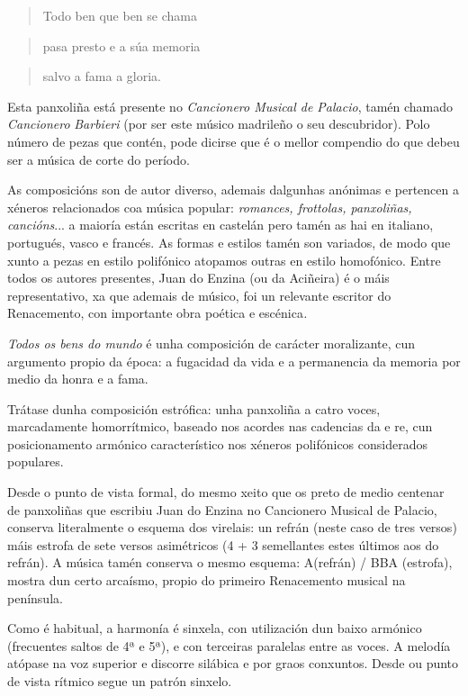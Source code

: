 \documentclass[
]{article}
\begin{document}
\begin{quote}
Todo ben que ben se chama
\end{quote}

\begin{quote}
pasa presto e a súa memoria
\end{quote}

\begin{quote}
salvo a fama a gloria.
\end{quote}

Esta panxoliña está presente no \emph{Cancionero Musical de Palacio},
tamén chamado \emph{Cancionero} \emph{Barbieri} (por ser este músico
madrileño o seu descubridor). Polo número de pezas que contén, pode
dicirse que é o mellor compendio do que debeu ser a música de corte do
período.

As composicións son de autor diverso, ademais dalgunhas anónimas e
pertencen a xéneros relacionados coa música popular: \emph{romances,
frottolas, panxoliñas, cancións}... a maioría están escritas en castelán
pero tamén as hai en italiano, portugués, vasco e francés. As formas e
estilos tamén son variados, de modo que xunto a pezas en estilo
polifónico atopamos outras en estilo homofónico. Entre todos os autores
presentes, Juan do Enzina (ou da Aciñeira) é o máis representativo, xa
que ademais de músico, foi un relevante escritor do Renacemento, con
importante obra poética e escénica\emph{.}

\emph{Todos os bens do mundo} é unha composición de carácter
moralizante, cun argumento propio da época: a fugacidad da vida e a
permanencia da memoria por medio da honra e a fama.

Trátase dunha composición estrófica: unha panxoliña a catro voces,
marcadamente homorrítmico, baseado nos acordes nas cadencias da e re,
cun posicionamento armónico característico nos xéneros polifónicos
considerados populares.

Desde o punto de vista formal, do mesmo xeito que os preto de medio
centenar de panxoliñas que escribiu Juan do Enzina no Cancionero Musical
de Palacio, conserva literalmente o esquema dos virelais: un refrán
(neste caso de tres versos) máis estrofa de sete versos asimétricos (4 +
3 semellantes estes últimos aos do refrán). A música tamén conserva o
mesmo esquema: A(refrán) / BBA (estrofa), mostra dun certo arcaísmo,
propio do primeiro Renacemento musical na península.

Como é habitual, a harmonía é sinxela, con utilización dun baixo
armónico (frecuentes saltos de 4ª e 5ª), e con terceiras paralelas entre
as voces. A melodía atópase na voz superior e discorre silábica e por
graos conxuntos. Desde ou punto de vista rítmico segue un patrón
sinxelo.
\end{document}
